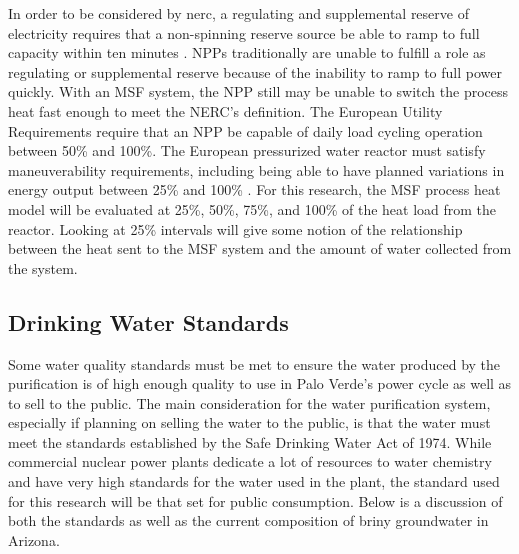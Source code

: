 In order to be considered by \ac{nerc}, a regulating and supplemental reserve of electricity requires that a non-spinning reserve source be able to ramp to full capacity within ten minutes \cite{NERC2014}. NPPs traditionally are unable to fulfill a role as regulating or supplemental reserve because of the inability to ramp to full power quickly.  With an MSF system, the NPP still may be unable to switch the process heat fast enough to meet the NERC's definition. The European Utility Requirements require that an NPP be capable of daily load cycling operation between 50\% and 100\%. The European pressurized water reactor must satisfy maneuverability requirements, including being able to have planned variations in energy output between 25\% and 100\% \cite{NEA2011}. For this research, the MSF process heat model will be evaluated at 25\%, 50\%, 75\%, and 100\% of the heat load from the reactor. Looking at 25\% intervals will give some notion of the relationship between the heat sent to the MSF system and the amount of water collected from the system.

\subsection{Drinking Water Standards}
Some water quality standards must be met to ensure the water produced by the purification is of high enough quality to use in Palo Verde's power cycle as well as to sell to the public. The main consideration for the water purification system, especially if planning on selling the water to the public, is that the water must meet the standards established by the Safe Drinking Water Act of 1974. While commercial nuclear power plants dedicate a lot of resources to water chemistry and have very high standards for the water used in the plant, the standard used for this research will be that set for public consumption. Below is a discussion of both the standards as well as the current composition of briny groundwater in Arizona.

